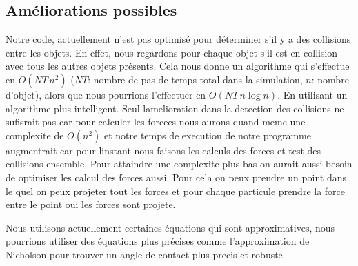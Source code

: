     \subsection{Améliorations possibles}
        Notre code, actuellement n'est pas optimisé pour déterminer s'il y a des collisions entre les objets. En effet, nous regardons pour chaque objet s'il est en collision avec tous les autres objets présents. Cela nous donne un algorithme qui s'effectue en $O(NT\,n^2)$ ($NT$: nombre de pas de temps total dans la simulation, $n$: nombre d'objet), alors que nous pourrions l'effectuer en $O(NT\, n\log n)$. En utilisant un algorithme plus intelligent. Seul lamelioration dans la detection des collisions ne sufisrait pas car pour calculer les forcees nous aurons quand meme une complexite de  $O(n^2)$ et notre temps de execution de notre programme augmentrait car pour linstant nous faisons les calculs des forces et test des collisions ensemble. Pour attaindre une complexite plus bas on aurait aussi besoin de optimiser les calcul des forces aussi. Pour cela on peux prendre un point dans le quel on peux projeter tout les forces et pour chaque particule prendre la force entre le point oui les forces sont projete. %

        Nous utilisons actuellement certaines équations qui sont approximatives, nous pourrions utiliser des équations plus précises comme l'approximation de Nicholson pour trouver un angle de contact plus precis et robuste.

